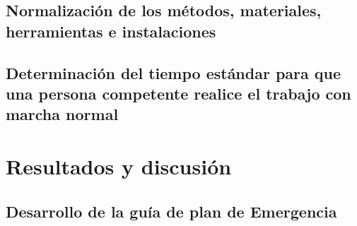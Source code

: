     \subsection{Normalización de los métodos, materiales, herramientas e instalaciones}
    
    \subsection{Determinación del tiempo estándar para que una persona competente realice el trabajo con marcha normal}
    
    
    
    
    
    \section{Resultados y discusión}
    
    \subsection{Desarrollo de la guía de plan de Emergencia}
    
